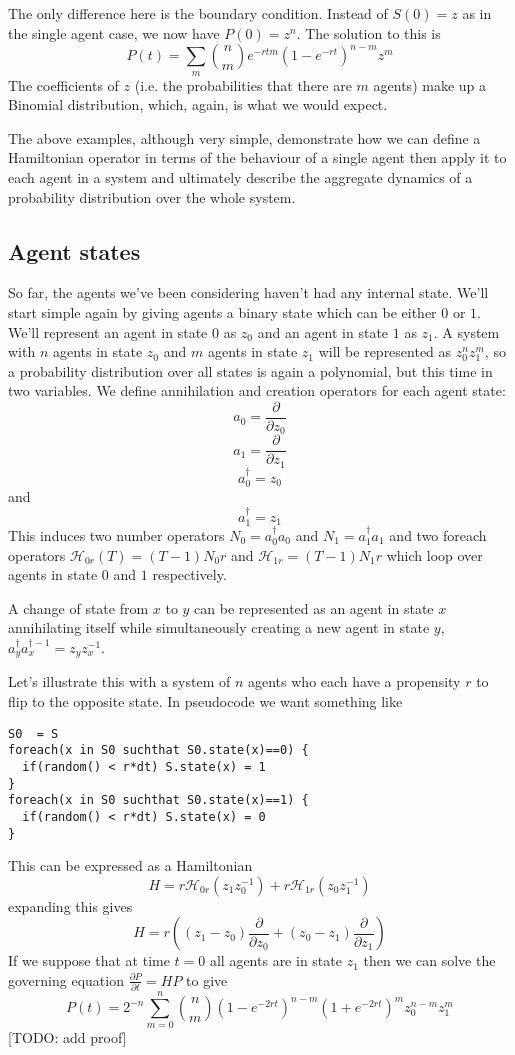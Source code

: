 \documentclass[letterpaper,twocolumn,10pt]{article}
\begin{document}
The only difference here is the boundary condition. Instead of $S(0) = z$ as in the single agent case, we now have $P(0) = z^n$. The solution to this is
\[
P(t) = \sum_m{n\choose m}e^{-rtm}(1-e^{-rt})^{n-m}z^m
\]
The coefficients of $z$ (i.e. the probabilities that there are $m$ agents) make up a Binomial distribution, which, again, is what we would expect.

The above examples, although very simple, demonstrate how we can define a Hamiltonian operator in terms of the behaviour of a single agent then apply it to each agent in a system and ultimately describe the aggregate dynamics of a probability distribution over the whole system.



\subsection{Agent states}

So far, the agents we've been considering haven't had any internal state. We'll start simple again by giving agents a binary state which can be either $0$ or $1$. We'll represent an agent in state $0$ as $z_0$ and an agent in state $1$ as $z_1$. A system with $n$ agents in state $z_0$ and $m$ agents in state $z_1$ will be represented as $z_0^nz_1^m$, so a probability distribution over all states is again a polynomial, but this time in two variables. We define annihilation and creation operators for each agent state:
\[
a_0 = \frac{\partial}{\partial z_0}
\]
\[
a_1 = \frac{\partial}{\partial z_1}
\]
\[
a_0^\dag = z_0
\]
and
\[
a_1^\dag = z_1
\]
This induces two number operators $N_0 = a_0^\dag a_0$ and $N_1 = a_1^\dag a_1$ and two foreach operators $\mathcal{H}_{0r}(T) = (T-1)N_0r$ and $\mathcal{H}_{1r} = (T-1)N_1r$ which loop over agents in state $0$ and $1$ respectively.

A change of state from $x$ to $y$ can be represented as an agent in state $x$ annihilating itself while simultaneously creating a new agent in state $y$, $a_y^\dag a_x^{\dag-1} = z_yz_x^{-1}$.

Let's illustrate this with a system of $n$ agents who each have a propensity $r$ to flip to the opposite state. In pseudocode we want something like
\begin{verbatim}
S0  = S
foreach(x in S0 suchthat S0.state(x)==0) {
  if(random() < r*dt) S.state(x) = 1
}
foreach(x in S0 suchthat S0.state(x)==1) {
  if(random() < r*dt) S.state(x) = 0
}
\end{verbatim}
 This can be expressed as a Hamiltonian
\[
H = r\mathcal{H}_{0r}(z_1 z_0^{-1}) + r\mathcal{H}_{1r}(z_0 z_1^{-1})
\]
expanding this gives
\[
H = r\left((z_1 - z_0)\frac{\partial}{\partial z_0} + (z_0 - z_1)\frac{\partial}{\partial z_1}\right)
\]
If we suppose that at time $t = 0$ all agents are in state $z_1$ then we can solve the governing equation $\frac{\partial P}{\partial t} = HP$ to give
\[
P(t) = 2^{-n} \sum_{m=0}^n {n\choose m} (1-e^{-2rt})^{n-m}(1+e^{-2rt})^m z_0^{n-m}z_1^m
\]
[TODO: add proof]
\end{document}
